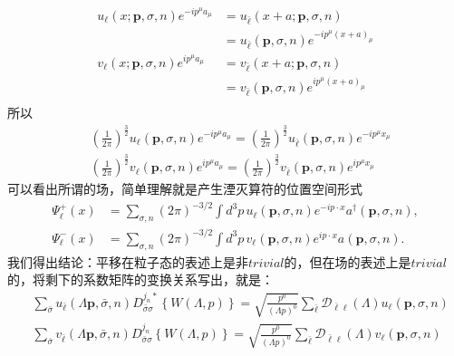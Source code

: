 \[\begin{aligned}
    u_\ell(x;\boldsymbol{p},\sigma,n)e^{-ip^\mu a_\mu}&=u_{\bar{\ell}}(x+a;\boldsymbol{p},\sigma,n)\\
    &=u_{\bar{\ell}}(\boldsymbol{p},\sigma,n)e^{-i p^\mu (x+a)_\mu}\\
    v_\ell(x;\boldsymbol{p},\sigma,n)e^{ip^\mu a_\mu}&=v_{\bar{\ell}}(x+a;\boldsymbol{p},\sigma,n)\\
    &=v_{\bar{\ell}}(\boldsymbol{p},\sigma,n)e^{i p^\mu (x+a)_\mu}\\
\end{aligned}\]
所以
\[ \begin{aligned}
    &(\frac{1}{2\pi})^{\frac{3}{2}}u_\ell(\boldsymbol{p},\sigma,n)e^{-ip^\mu a_\mu}=(\frac{1}{2\pi})^{\frac{3}{2}}u_{\bar{\ell}}(\boldsymbol{p},\sigma,n)e^{-i p^\mu x_\mu}\\ 
    &(\frac{1}{2\pi})^{\frac{3}{2}}v_\ell(\boldsymbol{p},\sigma,n)e^{ip^\mu a_\mu}=(\frac{1}{2\pi})^{\frac{3}{2}}v_{\bar{\ell}}(\boldsymbol{p},\sigma,n)e^{i p^\mu x_\mu}
\end{aligned}\]
可以看出所谓的场，简单理解就是产生湮灭算符的位置空间形式
\begin{subequations}
    \begin{align}
\Psi_\ell^+(x) &= \sum_{\sigma,n} (2\pi)^{-3/2} \int d^3p \, u_\ell(\boldsymbol{p}, \sigma, n) e^{-ip\cdot x} a^\dagger(\boldsymbol{p}, \sigma, n) , \\
\Psi_\ell^-(x) &= \sum_{\sigma,n} (2\pi)^{-3/2} \int d^3p \, v_\ell(\boldsymbol{p}, \sigma, n) e^{ip\cdot x} a(\boldsymbol{p}, \sigma, n) .
\end{align}
\end{subequations}
我们得出结论：平移在粒子态的表述上是非$trivial$的，但在场的表述上是$trivial$的，将剩下的系数矩阵的变换关系写出，就是：
\begin{subequations}
    \begin{align}
        &\sum_{\bar{\sigma}}u_{\bar{\ell}}(\Lambda \boldsymbol{p},\bar{\sigma},n)D_{\bar{\sigma}\sigma }^{j_n*}\left\{W(\Lambda,p)\right\}=\sqrt{\frac{p^0}{(\Lambda p)^0}}\sum_{\bar{\ell}}\mathscr{D}_{\bar{\ell}\ell}(\Lambda)u_{\ell}(\boldsymbol{p},\sigma,n)
        \\
        &\sum_{\bar{\sigma}}v_{\bar{\ell}}(\Lambda \boldsymbol{p},\bar{\sigma},n)D_{\bar{\sigma}\sigma }^{j_n}\left\{W(\Lambda,p)\right\}=\sqrt{\frac{p^0}{(\Lambda p)^0}}\sum_{\bar{\ell}}\mathscr{D}_{\bar{\ell}\ell}(\Lambda)v_{\ell}(\boldsymbol{p},\sigma,n)
    \end{align}
\end{subequations}
